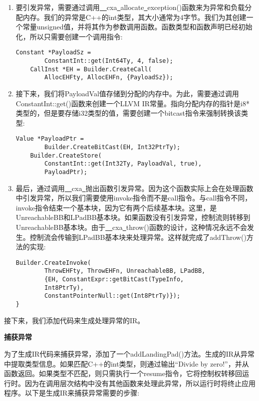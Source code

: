 \begin{enumerate}
\item 要引发异常，需要通过调用\underline{~~}cxa\underline{~}allocate\underline{~}exception()函数来为异常和负载分配内存。我们的异常是C++的int类型，其大小通常为4字节。我们为其创建一个常量unsigned值，并将其作为参数调用函数。函数类型和函数声明已经初始化，所以只需要创建一个调用指令:
\begin{lstlisting}[caption={}]
	Constant *PayloadSz =
		ConstantInt::get(Int64Ty, 4, false);
	CallInst *EH = Builder.CreateCall(
		AllocEHFty, AllocEHFn, {PayloadSz});
\end{lstlisting}

\item 接下来，我们将PayloadVal值存储到分配的内存中。为此，需要通过调用ConstantInt::get()函数来创建一个LLVM IR常量。指向分配内存的指针是i8*类型的，但是要存储i32类型的值，需要创建一个bitcast指令来强制转换该类型:
\begin{lstlisting}[caption={}]
	Value *PayloadPtr =
		Builder.CreateBitCast(EH, Int32PtrTy);
	Builder.CreateStore(
		ConstantInt::get(Int32Ty, PayloadVal, true),
		PayloadPtr);
\end{lstlisting}

\item 最后，通过调用\underline{~~}cxa\underline{~}抛出函数引发异常。因为这个函数实际上会在处理函数中引发异常，所以我们需要使用invoke指令而不是call指令。与call指令不同，invoke指令结束一个基本块，因为它有两个后续基本块。这里，是UnreachableBB和LPadBB基本块。如果函数没有引发异常，控制流则转移到UnreachableBB基本块。由于\underline{~~}cxa\underline{~}throw()函数的设计，这种情况永远不会发生。控制流会传输到LPadBB基本块来处理异常。这样就完成了addThrow()方法的实现:
\begin{lstlisting}[caption={}]
	Builder.CreateInvoke(
		ThrowEHFty, ThrowEHFn, UnreachableBB, LPadBB,
		{EH, ConstantExpr::getBitCast(TypeInfo, 
		Int8PtrTy),
		ConstantPointerNull::get(Int8PtrTy)});
}
\end{lstlisting}
\end{enumerate}

接下来，我们添加代码来生成处理异常的IR。\par

\hspace*{\fill} \par %
\textbf{捕获异常}

为了生成IR代码来捕获异常，添加了一个addLandingPad()方法。生成的IR从异常中提取类型信息。如果匹配C++的int类型，则通过输出“Divide by zero!”，并从函数返回。如果类型不匹配，则只需执行一个resume指令，它将控制权转移回运行时。因为在调用层次结构中没有其他函数来处理此异常，所以运行时将终止应用程序。以下是生成IR来捕获异常需要的步骤:\par

